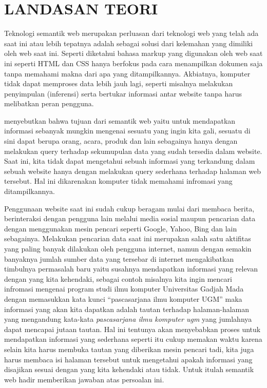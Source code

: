 \chapter{LANDASAN TEORI}
Teknologi semantik web merupakan perluasan dari teknologi web yang telah ada saat ini atau lebih tepatnya adalah sebagai solusi dari kelemahan yang dimiliki oleh web saat ini. Seperti diketahui bahasa markup yang digunakan oleh web saat ini seperti HTML dan CSS hanya berfokus pada cara menampilkan dokumen saja tanpa memahami makna dari apa yang ditampilkannya. Akbiatnya, komputer tidak dapat memproses data lebih jauh lagi, seperti misalnya melakukan penyimpulan (inferensi) serta bertukar informasi antar website tanpa harus melibatkan peran pengguna.

\citet{liyang_yu} menyebutkan bahwa tujuan dari semantik web yaitu untuk mendapatkan informasi sebanyak mungkin mengenai sesuatu yang ingin kita gali, sesuatu di sini dapat berupa orang, acara, produk dan lain sebagainya hanya dengan melakukan query terhadap sekumupulan data yang sudah tersedia dalam website. Saat ini, kita tidak dapat mengetahui sebuah informasi yang terkandung dalam sebuah website hanya dengan melakukan query sederhana terhadap halaman web tersebut. Hal ini dikarenakan komputer tidak memahami infromasi yang ditampilkannya.

Penggunaan website saat ini sudah cukup beragam mulai dari membaca berita, berinteraksi dengan pengguna lain melalui media sosial maupun pencarian data dengan menggunakan mesin pencari seperti Google, Yahoo, Bing dan lain sebagainya. Melakukan pencarian data saat ini merupakan salah satu aktifitas yang paling banyak dilakukan oleh pengguna internet, namun dengan semakin banyaknya jumlah sumber data yang tersebar di internet mengakibatkan timbulnya permasalah baru yaitu susahnya mendapatkan informasi yang relevan dengan yang kita kehendaki, sebagai contoh misalnya kita ingin mencari infromasi mengenai program studi ilmu komputer Universitas Gadjah Mada dengan memasukkan kata kunci ``pascasarjana ilmu komputer UGM'' maka informasi yang akan kita dapatkan adalah tautan terhadap halaman-halaman yang mengandung kata-kata \emph{pascasarjana ilmu komputer ugm} yang jumlahnya dapat mencapai jutaan tautan. Hal ini tentunya akan menyebabkan proses untuk mendapatkan informasi yang sederhana seperti itu cukup memakan waktu karena selain kita harus membuka tautan yang diberikan mesin pencari tadi, kita juga harus membaca isi halaman tersebut untuk mengetahui apakah informasi yang disajikan sesuai dengan yang kita kehendaki atau tidak. Untuk itulah semantik web hadir memberikan jawaban atas persoalan ini.



% 
% 



